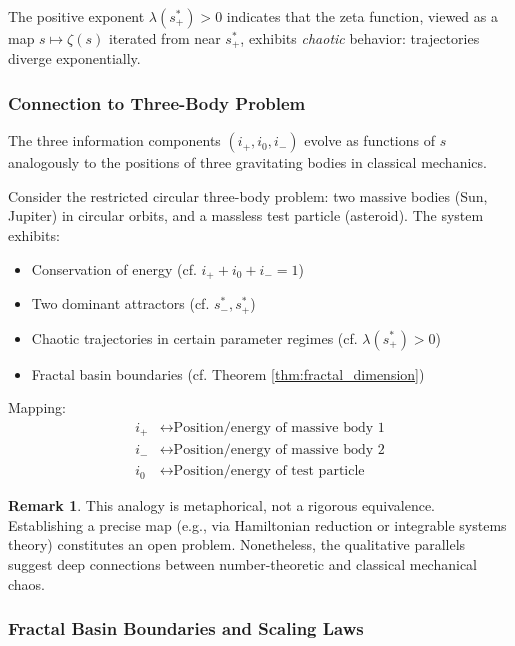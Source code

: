 \documentclass[12pt]{article}
\theoremstyle{plain}
\theoremstyle{definition}
\newtheorem{remark}[theorem]{Remark}
\begin{document}
The positive exponent $\lambda(s_+^*) > 0$ indicates that the zeta function, viewed as a map $s \mapsto \zeta(s)$ iterated from near $s_+^*$, exhibits \emph{chaotic} behavior: trajectories diverge exponentially.

\subsubsection{Connection to Three-Body Problem}

The three information components $(i_+, i_0, i_-)$ evolve as functions of $s$ analogously to the positions of three gravitating bodies in classical mechanics.

\begin{analogy}\label{analogy:three_body}
Consider the restricted circular three-body problem: two massive bodies (Sun, Jupiter) in circular orbits, and a massless test particle (asteroid). The system exhibits:
\begin{itemize}
\item Conservation of energy (cf. $i_+ + i_0 + i_- = 1$)
\item Two dominant attractors (cf. $s_-^*, s_+^*$)
\item Chaotic trajectories in certain parameter regimes (cf. $\lambda(s_+^*) > 0$)
\item Fractal basin boundaries (cf. Theorem \ref{thm:fractal_dimension})
\end{itemize}

Mapping:
\begin{align*}
i_+ &\leftrightarrow \text{Position/energy of massive body 1} \\
i_- &\leftrightarrow \text{Position/energy of massive body 2} \\
i_0 &\leftrightarrow \text{Position/energy of test particle}
\end{align*}
\end{analogy}

\begin{remark}
This analogy is metaphorical, not a rigorous equivalence. Establishing a precise map (e.g., via Hamiltonian reduction or integrable systems theory) constitutes an open problem. Nonetheless, the qualitative parallels suggest deep connections between number-theoretic and classical mechanical chaos.
\end{remark}

\subsubsection{Fractal Basin Boundaries and Scaling Laws}
\end{document}
